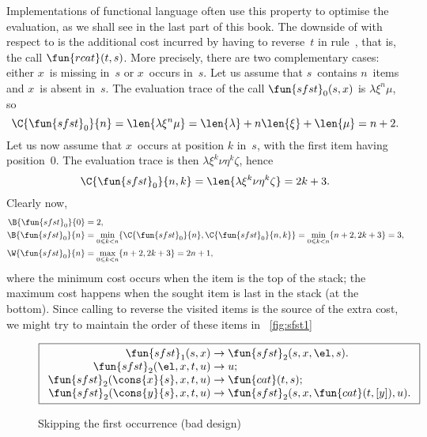 Implementations of functional language often use this property to
optimise the evaluation, as we shall see in the last part of this
book. The downside of  with respect to 
is the additional cost incurred by having to reverse~\(t\) in
rule~\clause{\nu}, that is, the call \(\fun{rcat}(t,s)\). More
precisely, there are two complementary cases: either \(x\)~is missing
in~\(s\) or \(x\)~occurs in~\(s\). Let us assume that \(s\)~contains
\(n\)~items and \(x\)~is absent in~\(s\). The evaluation trace
 of the call
\(\fun{sfst}_0(s,x)\) is \(\lambda\xi^n\mu\), so
\begin{equation*}
  \C{\fun{sfst}_0}{n}
= \len{\lambda\xi^n\mu} = \len{\lambda} + n \len{\xi} + \len{\mu} = n
+ 2.
\end{equation*}
Let us now assume that \(x\)~occurs at position \(k\) in~\(s\),
with the first item having position~\(0\). The evaluation trace is
then \(\lambda \xi^{k}\nu\eta^k\zeta\), hence
\begin{equation*}
  \C{\fun{sfst}_0}{n,k} = \len{\lambda \xi^{k}\nu\eta^k\zeta} = 2k + 3.
\end{equation*}
Clearly now,
\begin{align*}
\B{\fun{sfst}_0}{0} & = 2,\\
\B{\fun{sfst}_0}{n} & = \min_{0 \leqslant k < n}\{\C{\fun{sfst}_0}{n}, \C{\fun{sfst}_0}{n,k}\}
                    = \min_{0 \leqslant k < n}\{n+2,2k+3\} = 3,\\
\W{\fun{sfst}_0}{n} & = \max_{0 \leqslant k < n}\{n+2,2k+3\} = 2n+1,
\end{align*}
where the minimum cost occurs when the item is the top of the stack;
the maximum cost happens when the sought item is last in the stack (at
the bottom). Since calling  to
reverse the visited items is the source of the extra cost, we might
try to maintain the order of these items in
\fig~\vref{fig:sfst1}
\begin{figure}[b]
\begin{equation*}
\boxed{%
\begin{array}{r@{\;}l@{\;}l}
\fun{sfst}_1(s,x)               & \rightarrow
                                & \fun{sfst}_2(s,x,\el,s).\\
\fun{sfst}_2(\el,x,t,u)         & \rightarrow & u;\\
\fun{sfst}_2(\cons{x}{s},x,t,u) & \rightarrow & \fun{cat}(t,s);\\
\fun{sfst}_2(\cons{y}{s},x,t,u) & \rightarrow
                                & \fun{sfst}_2(s,x,\fun{cat}(t,[y]),u).
\end{array}}
\end{equation*}
\caption{Skipping the first occurrence (bad design)}
\label{fig:sfst1}
\end{figure}
